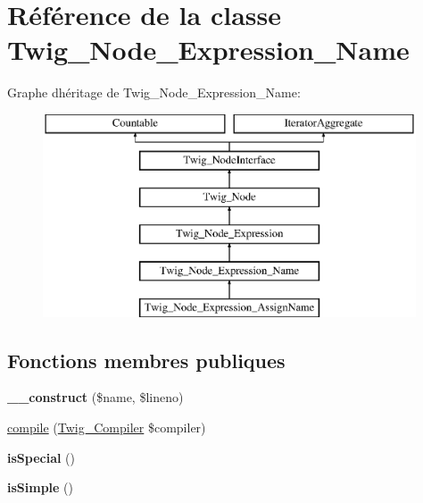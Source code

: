 \hypertarget{class_twig___node___expression___name}{}\section{Référence de la classe Twig\+\_\+\+Node\+\_\+\+Expression\+\_\+\+Name}
\label{class_twig___node___expression___name}
Graphe d\textquotesingle{}héritage de Twig\+\_\+\+Node\+\_\+\+Expression\+\_\+\+Name\+:\begin{figure}[H]
\begin{center}
\leavevmode
\includegraphics[height=6.000000cm]{class_twig___node___expression___name}
\end{center}
\end{figure}
\subsection*{Fonctions membres publiques}
\begin{DoxyCompactItemize}
\item 
{\bfseries \+\_\+\+\_\+construct} (\$name, \$lineno)\hypertarget{class_twig___node___expression___name_ae217ce26c809152fd385490096a36b75}{}\label{class_twig___node___expression___name_ae217ce26c809152fd385490096a36b75}

\item 
\hyperlink{class_twig___node___expression___name_a4e0faa87c3fae583620b84d3607085da}{compile} (\hyperlink{class_twig___compiler}{Twig\+\_\+\+Compiler} \$compiler)
\item 
{\bfseries is\+Special} ()\hypertarget{class_twig___node___expression___name_aa7e150f528378b8f7268e1ae27ebb1af}{}\label{class_twig___node___expression___name_aa7e150f528378b8f7268e1ae27ebb1af}

\item 
{\bfseries is\+Simple} ()\hypertarget{class_twig___node___expression___name_a270d6ef7fb3863dbd4d27027b21f6ecb}{}\label{class_twig___node___expression___name_a270d6ef7fb3863dbd4d27027b21f6ecb}

\end{DoxyCompactItemize}
